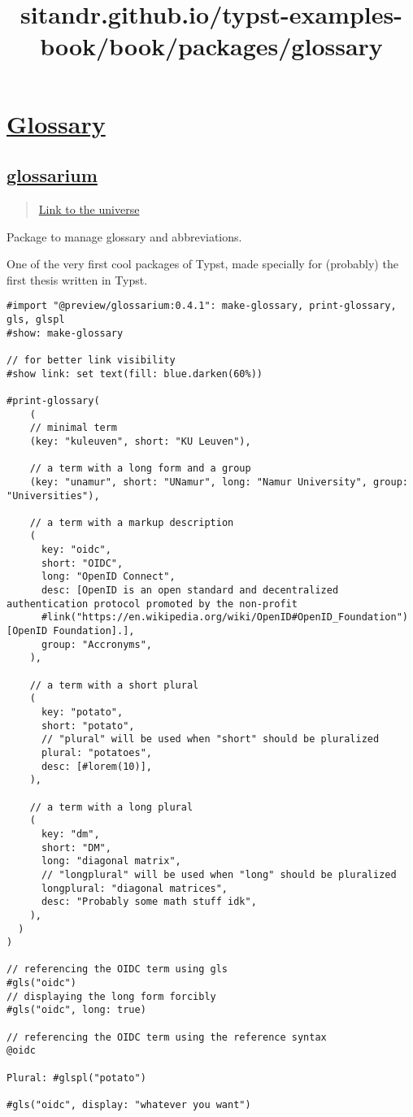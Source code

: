 \title{sitandr.github.io/typst-examples-book/book/packages/glossary}

\section{\texorpdfstring{\hyperref[glossary]{Glossary}}{Glossary}}\label{glossary}

\subsection{\texorpdfstring{\hyperref[glossarium]{glossarium}}{glossarium}}\label{glossarium}

\begin{quote}
\href{https://typst.app/universe/package/glossarium}{Link to the
universe}
\end{quote}

Package to manage glossary and abbreviations.

One of the very first cool packages of Typst, made specially for
(probably) the first thesis written in Typst.

\begin{verbatim}
#import "@preview/glossarium:0.4.1": make-glossary, print-glossary, gls, glspl
#show: make-glossary

// for better link visibility
#show link: set text(fill: blue.darken(60%))

#print-glossary(
    (
    // minimal term
    (key: "kuleuven", short: "KU Leuven"),

    // a term with a long form and a group
    (key: "unamur", short: "UNamur", long: "Namur University", group: "Universities"),

    // a term with a markup description
    (
      key: "oidc",
      short: "OIDC",
      long: "OpenID Connect",
      desc: [OpenID is an open standard and decentralized authentication protocol promoted by the non-profit
      #link("https://en.wikipedia.org/wiki/OpenID#OpenID_Foundation")[OpenID Foundation].],
      group: "Accronyms",
    ),

    // a term with a short plural
    (
      key: "potato",
      short: "potato",
      // "plural" will be used when "short" should be pluralized
      plural: "potatoes",
      desc: [#lorem(10)],
    ),

    // a term with a long plural
    (
      key: "dm",
      short: "DM",
      long: "diagonal matrix",
      // "longplural" will be used when "long" should be pluralized
      longplural: "diagonal matrices",
      desc: "Probably some math stuff idk",
    ),
  )
)

// referencing the OIDC term using gls
#gls("oidc")
// displaying the long form forcibly
#gls("oidc", long: true)

// referencing the OIDC term using the reference syntax
@oidc

Plural: #glspl("potato")

#gls("oidc", display: "whatever you want")
\end{verbatim}

\pandocbounded{}
